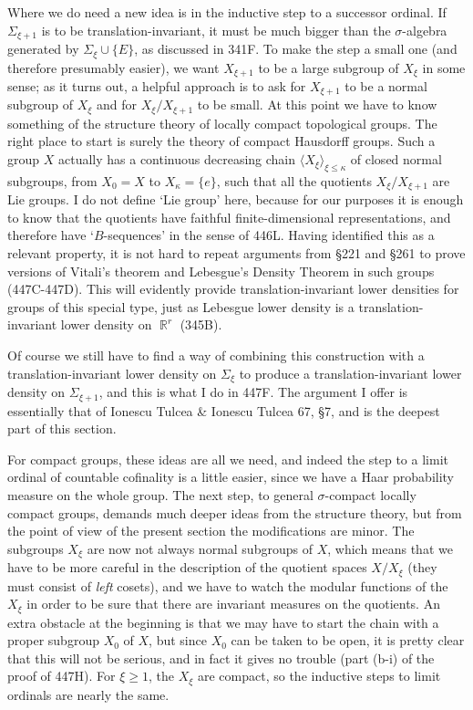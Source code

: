 {Where we do need a new idea is in the inductive step to a successor
ordinal.   If $\Sigma_{\xi+1}$ is to be translation-invariant, it must
be much bigger than the $\sigma$-algebra generated by
$\Sigma_{\xi}\cup\{E\}$, as discussed in 341F.   To make the step a
small one (and therefore presumably easier), we want $X_{\xi+1}$ to be a
large subgroup of $X_{\xi}$ in some sense;  as it turns out, a helpful
approach is to ask for $X_{\xi+1}$ to be a normal subgroup of $X_{\xi}$
and for $X_{\xi}/X_{\xi+1}$ to be small.   At this point we have to know
something of the structure theory of locally compact topological groups.
The right place to start is surely the theory of compact
Hausdorff groups.   Such a group $X$ actually has a continuous
decreasing chain $\langle X_{\xi}\rangle_{\xi\le\kappa}$ of closed
normal subgroups, from $X_0=X$ to $X_{\kappa}=\{e\}$, such that all the
quotients $X_{\xi}/X_{\xi+1}$ are Lie groups.   I do not define `Lie
group' here, because for our purposes it is enough to know that the
quotients have faithful finite-dimensional representations, and
therefore have `$B$-sequences' in the sense of 446L.   Having
identified this as a relevant property, it is not hard to repeat
arguments from \S221 and \S261 to prove versions of Vitali's theorem
and Lebesgue's Density Theorem in such groups (447C-447D).   This will
evidently provide translation-invariant lower densities for groups of
this special type, just as Lebesgue lower density is a
translation-invariant lower density on $\BbbR^r$ (345B).

Of course we still have to find a way of combining this construction
with a translation-invariant lower density on $\Sigma_{\xi}$ to produce
a translation-invariant lower density on $\Sigma_{\xi+1}$, and this is
what I do in 447F.   The argument I offer is essentially that of
{\smc Ionescu Tulcea \& Ionescu Tulcea 67}, \S7, and is the deepest part of
this section.

For compact groups, these ideas are all we need, and indeed the step to
a limit ordinal of countable cofinality is a little easier, since we
have a Haar probability measure on the whole group.   The next step, to
general $\sigma$-compact locally compact groups, demands much deeper
ideas from the structure theory, but from the point of view of the
present section the modifications are minor.   The subgroups $X_{\xi}$
are now not always normal subgroups of $X$, which means that we have to
be more careful in the description of the quotient spaces $X/X_{\xi}$
(they must consist of {\it left} cosets), and we have to watch the
modular functions of the $X_{\xi}$ in order to be sure that there are
invariant measures on the quotients.   An extra obstacle at the
beginning is that we may have to start the chain with a proper subgroup
$X_0$ of $X$, but since $X_0$ can be taken to be open, it is pretty
clear that this will not be serious, and in fact it gives no trouble
(part (b-i) of the proof of 447H).   For $\xi\ge 1$, the $X_{\xi}$ are
compact, so the
inductive steps to limit ordinals are nearly the same.

}
